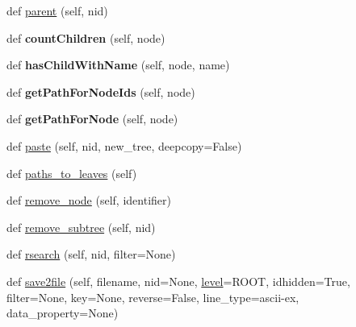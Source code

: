 \begin{DoxyCompactItemize}
\item 
def \mbox{\hyperlink{classapp_1_1main_1_1treelib_1_1tree_1_1Tree_a28ccb73f9aed492e66d879c664dc3b35}{parent}} (self, nid)
\item 
\mbox{\label{classapp_1_1main_1_1treelib_1_1tree_1_1Tree_a16215d893aaf0078bf5d5571aa62b778}} 
def {\bfseries count\+Children} (self, node)
\item 
\mbox{\label{classapp_1_1main_1_1treelib_1_1tree_1_1Tree_ae89bf0c76e077786251d6687b43cfea0}} 
def {\bfseries has\+Child\+With\+Name} (self, node, name)
\item 
\mbox{\label{classapp_1_1main_1_1treelib_1_1tree_1_1Tree_a45d3504fef6c6839b6190c122c55ca07}} 
def {\bfseries get\+Path\+For\+Node\+Ids} (self, node)
\item 
\mbox{\label{classapp_1_1main_1_1treelib_1_1tree_1_1Tree_ac2cefd6987ad5ff487c00d7d95ff3a96}} 
def {\bfseries get\+Path\+For\+Node} (self, node)
\item 
def \mbox{\hyperlink{classapp_1_1main_1_1treelib_1_1tree_1_1Tree_a813bf6c69928f2004c0f1e04ce14e9b8}{paste}} (self, nid, new\+\_\+tree, deepcopy=False)
\item 
def \mbox{\hyperlink{classapp_1_1main_1_1treelib_1_1tree_1_1Tree_a0ce0cd39e8c6323cc9112b6f2325ffec}{paths\+\_\+to\+\_\+leaves}} (self)
\item 
def \mbox{\hyperlink{classapp_1_1main_1_1treelib_1_1tree_1_1Tree_ae560ce8ccbc05b3c7c70213606c64ae6}{remove\+\_\+node}} (self, identifier)
\item 
def \mbox{\hyperlink{classapp_1_1main_1_1treelib_1_1tree_1_1Tree_ad0f4edc203b3ea5d3bf5e77e2d8811e3}{remove\+\_\+subtree}} (self, nid)
\item 
def \mbox{\hyperlink{classapp_1_1main_1_1treelib_1_1tree_1_1Tree_a04080e6799c3bbc702b13953b466d757}{rsearch}} (self, nid, filter=None)
\item 
def \mbox{\hyperlink{classapp_1_1main_1_1treelib_1_1tree_1_1Tree_acfa08f527ee2152c58e090e3c5a698a1}{save2file}} (self, filename, nid=None, \mbox{\hyperlink{classapp_1_1main_1_1treelib_1_1tree_1_1Tree_a3d528173abf063f97e6dfbcf29a0564b}{level}}=R\+O\+OT, idhidden=True, filter=None, key=None, reverse=False, line\+\_\+type=\textquotesingle{}ascii-\/ex\textquotesingle{}, data\+\_\+property=None)

\end{DoxyCompactItemize}
